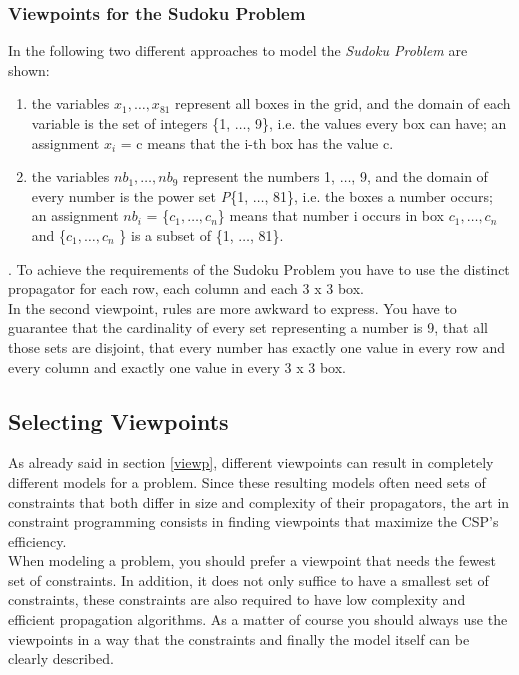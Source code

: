 \documentclass[a4paper]{scrartcl}
\begin{document}
\subsubsection{Viewpoints for the Sudoku Problem}
In the following two different approaches to model
the {\it Sudoku Problem} are shown:
\begin{enumerate}
\item
the variables $x_1, \ldots, x_{81}$ represent all boxes
in the grid, and the domain of each variable is the set
of integers \{1, $\ldots$, 9\}, i.e. the values every box
can have; an assignment $x_i$ = c means that the i-th box
has the value c.
\item
the variables $nb_1, \ldots, nb_9$ represent the numbers
1, $\ldots$, 9, and the domain of every number is the power set
{\it P}\{1, $\ldots$, 81\}, i.e. the boxes a number occurs; an
assignment $nb_i$ = \{$c_1, \ldots, c_n $\} means that number i occurs
in box $c_1, \ldots, c_n$ and \{$c_1, \ldots, c_n $ \} is a subset of 
\{1, $\ldots$, 81\}.
\end{enumerate}
. 
To achieve the requirements of the Sudoku Problem you have to
use the distinct propagator for each row, each column and each
3 x 3 box.\\
In the second viewpoint, rules are more awkward to express.
You have to guarantee that the cardinality of every set representing
a number is 9, that all those sets are disjoint, that every number
has exactly one value in every row and every column and exactly one
value in every 3 x 3 box.

\subsection{Selecting Viewpoints}
As already said in section \ref{viewp}, different viewpoints can
result in completely different models for a problem. Since these
resulting models often need sets of constraints that both differ 
in size and complexity of their propagators, the art in constraint 
programming consists in finding viewpoints that maximize the CSP's
efficiency.\\ 
When modeling a problem, you should prefer a viewpoint that needs
the fewest set of constraints. In addition, it does not only suffice
to have a smallest set of constraints, these constraints are also
required to have low complexity and efficient propagation algorithms. 
As a matter of course you should always use the viewpoints in a way that
the constraints and finally the model itself can be clearly described.
\end{document}
